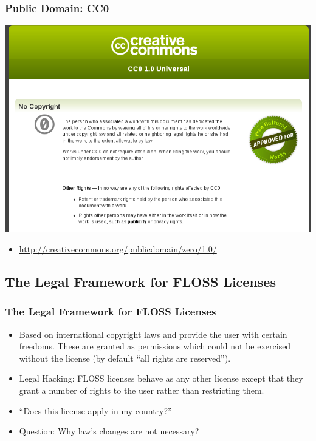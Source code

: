 \documentclass{beamer}
\begin{document}
\begin{frame}
\frametitle{Public Domain: CC0}

\vspace{-0.25cm}
\begin{center}
\includegraphics[scale=0.3,clip=true]{figs/cc0.png}
\end{center}
\vspace{-0.5cm}
\begin{itemize}
\item \url{http://creativecommons.org/publicdomain/zero/1.0/}
\end{itemize}

\end{frame}


\subsection{The Legal Framework for FLOSS Licenses}
\begin{frame}
\frametitle{The Legal Framework for FLOSS Licenses}
\begin{itemize}
\item Based on international copyright laws and provide the user with certain freedoms. These are granted as permissions which \alert{could not be exercised} without the license (by default ``all rights are reserved'').
\item \alert{Legal Hacking:} FLOSS licenses behave as any other license except that they grant a number of rights to the user rather than restricting them. 
\item ``Does this license apply in my country?''
\item \alert{Question:} Why law's changes are not necessary? 
\end{itemize}

\end{frame}
\end{document}
